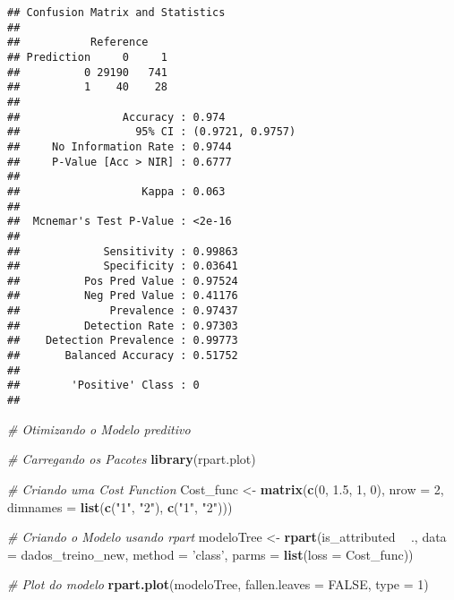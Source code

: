 \documentclass[]{article}
\newenvironment{Shaded}{\begin{snugshade}}{\end{snugshade}}
\newcommand{\CommentTok}[1]{\textcolor[rgb]{0.56,0.35,0.01}{\textit{#1}}}
\newcommand{\DataTypeTok}[1]{\textcolor[rgb]{0.13,0.29,0.53}{#1}}
\newcommand{\DecValTok}[1]{\textcolor[rgb]{0.00,0.00,0.81}{#1}}
\newcommand{\FloatTok}[1]{\textcolor[rgb]{0.00,0.00,0.81}{#1}}
\newcommand{\KeywordTok}[1]{\textcolor[rgb]{0.13,0.29,0.53}{\textbf{#1}}}
\newcommand{\NormalTok}[1]{#1}
\newcommand{\OperatorTok}[1]{\textcolor[rgb]{0.81,0.36,0.00}{\textbf{#1}}}
\newcommand{\OtherTok}[1]{\textcolor[rgb]{0.56,0.35,0.01}{#1}}
\newcommand{\StringTok}[1]{\textcolor[rgb]{0.31,0.60,0.02}{#1}}
\begin{document}
\begin{verbatim}
## Confusion Matrix and Statistics
## 
##           Reference
## Prediction     0     1
##          0 29190   741
##          1    40    28
##                                           
##                Accuracy : 0.974           
##                  95% CI : (0.9721, 0.9757)
##     No Information Rate : 0.9744          
##     P-Value [Acc > NIR] : 0.6777          
##                                           
##                   Kappa : 0.063           
##                                           
##  Mcnemar's Test P-Value : <2e-16          
##                                           
##             Sensitivity : 0.99863         
##             Specificity : 0.03641         
##          Pos Pred Value : 0.97524         
##          Neg Pred Value : 0.41176         
##              Prevalence : 0.97437         
##          Detection Rate : 0.97303         
##    Detection Prevalence : 0.99773         
##       Balanced Accuracy : 0.51752         
##                                           
##        'Positive' Class : 0               
## 
\end{verbatim}

\begin{Shaded}
\begin{Highlighting}[]
\CommentTok{# Otimizando o Modelo preditivo}

\CommentTok{# Carregando os Pacotes}
\KeywordTok{library}\NormalTok{(rpart.plot)}

\CommentTok{# Criando uma Cost Function}
\NormalTok{Cost_func <-}\StringTok{ }\KeywordTok{matrix}\NormalTok{(}\KeywordTok{c}\NormalTok{(}\DecValTok{0}\NormalTok{, }\FloatTok{1.5}\NormalTok{, }\DecValTok{1}\NormalTok{, }\DecValTok{0}\NormalTok{), }\DataTypeTok{nrow =} \DecValTok{2}\NormalTok{, }\DataTypeTok{dimnames =} \KeywordTok{list}\NormalTok{(}\KeywordTok{c}\NormalTok{(}\StringTok{"1"}\NormalTok{, }\StringTok{"2"}\NormalTok{), }\KeywordTok{c}\NormalTok{(}\StringTok{"1"}\NormalTok{, }\StringTok{"2"}\NormalTok{)))}

\CommentTok{# Criando o Modelo usando rpart}
\NormalTok{modeloTree <-}\StringTok{ }\KeywordTok{rpart}\NormalTok{(is_attributed }\OperatorTok{~}\StringTok{ }\NormalTok{.,}
                    \DataTypeTok{data =}\NormalTok{ dados_treino_new,}
                    \DataTypeTok{method =} \StringTok{'class'}\NormalTok{,}
                    \DataTypeTok{parms =} \KeywordTok{list}\NormalTok{(}\DataTypeTok{loss =}\NormalTok{ Cost_func))}

\CommentTok{# Plot do modelo}
\KeywordTok{rpart.plot}\NormalTok{(modeloTree, }\DataTypeTok{fallen.leaves =} \OtherTok{FALSE}\NormalTok{, }\DataTypeTok{type =} \DecValTok{1}\NormalTok{)}
\end{Highlighting}
\end{Shaded}
\end{document}

